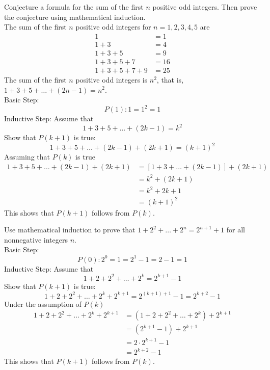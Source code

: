 \documentclass[12pt]{article}
\begin{document}
\begin{example} Conjecture a formula for the sum of the first $n$ positive odd integers. Then prove the conjecture using mathematical induction. \\ The sum of the first $n$ positive odd integers for $n = 1, 2, 3, 4, 5$ are $$\begin{aligned} 1 &= 1 \\ 1 + 3 &= 4 \\ 1 + 3 + 5 &= 9 \\ 1 + 3 + 5 + 7 &= 16 \\ 1 + 3 + 5 + 7 + 9 &= 25 \end{aligned} $$ The sum of the first $n$ positive odd integers is $n^2$, that is, $1 + 3 + 5 + \dots + (2n - 1) = n^2$. \\ 
Basic Step: $$P(1): 1 = 1^2 = 1$$
Inductive Step: Assume that $$1 + 3 + 5 + \dots + (2k - 1) = k^2$$ Show that $P(k + 1)$ is true: $$1 + 3 + 5 + \dots + (2k - 1) + (2k + 1) = (k + 1)^2$$ Assuming that $P(k)$ is true $$\begin{aligned} 
1 + 3 + 5 + \dots + (2k -1) + (2k + 1) &= [1 + 3 + \dots + (2k - 1)] + (2k + 1) \\ &= k^2 + (2k + 1) \\ &= k^2 + 2k + 1 \\ &= (k + 1)^2 \end{aligned} $$ This shows that $P(k + 1)$ follows from $P(k)$. \end{example} 
\begin{example} Use mathematical induction to prove that $1 + 2^2 + \dots + 2^n = 2^{n + 1} + 1 $ for all nonnegative integers $n$. \\ Basic Step: $$P(0): 2^0 = 1 = 2^1 - 1 = 2 - 1 = 1 $$ 
Inductive Step: Assume that $$1 + 2 + 2^2 + \dots + 2^k = 2^{k + 1} - 1$$ Show that $P(k + 1)$ is true: $$1 + 2 + 2^2 + \dots + 2^k + 2^{k + 1} = 2^{(k + 1) + 1} - 1 = 2^{k + 2} - 1$$ Under the assumption of $P(k)$ $$\begin{aligned} 1 + 2 + 2^2 + \dots + 2^k + 2^{k + 1} &= (1 + 2 + 2^2 + \dots + 2^k) + 2^{k + 1} \\ &= (2^{k + 1} - 1) + 2^{k + 1} \\ &= 2 \cdot 2^{k + 1} - 1 \\ &= 2^{k + 2} - 1 \end{aligned} $$ This shows that $P(k + 1)$ follows from $P(k)$. \end{example} 
\end{document}
